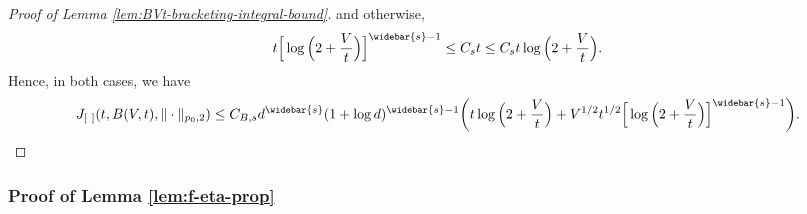 \documentclass[10pt]{article}
\begin{document}
\begin{proof}[Proof of Lemma \ref{lem:BVt-bracketing-integral-bound}]
and otherwise,
\begin{equation*}
    t \Big[\log\Big(2 + \frac{V}{t}\Big)\Big]^{\widebar{s} - 1}
    \le C_s t \le C_s t \log\Big(2 + \frac{V}{t}\Big).
\end{equation*}
Hence, in both cases, we have
\begin{equation*}
    J_{[ \ ]}(t, B(V, t), \| \cdot \|_{p_0, 2})  
    \le C_{B, s} d^{\widebar{s}}(1 + \log d)^{\widebar{s} - 1} 
    \bigg(t \log\Big(2 + \frac{V}{t}\Big)
    + V^{1/2}t^{1/2} 
    \Big[\log\Big(2 + \frac{V}{t}\Big)\Big]^{\widebar{s} - 1}\bigg).
\end{equation*}
\end{proof}

\subsubsection{Proof of Lemma \ref{lem:f-eta-prop}}
\label{pf:f-eta-prop}
\end{document}
